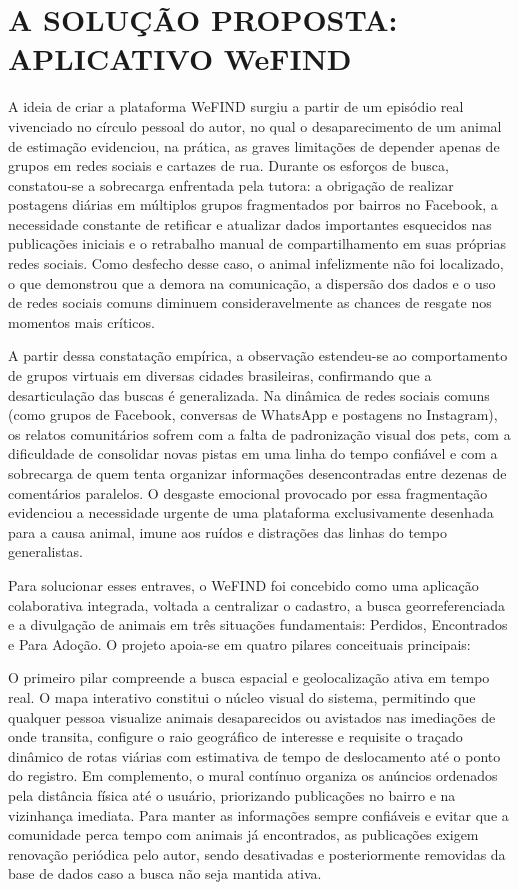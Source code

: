 \section{A SOLUÇÃO PROPOSTA: APLICATIVO WeFIND}

A ideia de criar a plataforma WeFIND surgiu a partir de um episódio real vivenciado no círculo pessoal do autor, no qual o desaparecimento de um animal de estimação evidenciou, na prática, as graves limitações de depender apenas de grupos em redes sociais e cartazes de rua. Durante os esforços de busca, constatou-se a sobrecarga enfrentada pela tutora: a obrigação de realizar postagens diárias em múltiplos grupos fragmentados por bairros no Facebook, a necessidade constante de retificar e atualizar dados importantes esquecidos nas publicações iniciais e o retrabalho manual de compartilhamento em suas próprias redes sociais. Como desfecho desse caso, o animal infelizmente não foi localizado, o que demonstrou que a demora na comunicação, a dispersão dos dados e o uso de redes sociais comuns diminuem consideravelmente as chances de resgate nos momentos mais críticos.

A partir dessa constatação empírica, a observação estendeu-se ao comportamento de grupos virtuais em diversas cidades brasileiras, confirmando que a desarticulação das buscas é generalizada. Na dinâmica de redes sociais comuns (como grupos de Facebook, conversas de WhatsApp e postagens no Instagram), os relatos comunitários sofrem com a falta de padronização visual dos pets, com a dificuldade de consolidar novas pistas em uma linha do tempo confiável e com a sobrecarga de quem tenta organizar informações desencontradas entre dezenas de comentários paralelos. O desgaste emocional provocado por essa fragmentação evidenciou a necessidade urgente de uma plataforma exclusivamente desenhada para a causa animal, imune aos ruídos e distrações das linhas do tempo generalistas.

Para solucionar esses entraves, o WeFIND foi concebido como uma aplicação colaborativa integrada, voltada a centralizar o cadastro, a busca georreferenciada e a divulgação de animais em três situações fundamentais: Perdidos, Encontrados e Para Adoção. O projeto apoia-se em quatro pilares conceituais principais:

O primeiro pilar compreende a busca espacial e geolocalização ativa em tempo real. O mapa interativo constitui o núcleo visual do sistema, permitindo que qualquer pessoa visualize animais desaparecidos ou avistados nas imediações de onde transita, configure o raio geográfico de interesse e requisite o traçado dinâmico de rotas viárias com estimativa de tempo de deslocamento até o ponto do registro. Em complemento, o mural contínuo organiza os anúncios ordenados pela distância física até o usuário, priorizando publicações no bairro e na vizinhança imediata. Para manter as informações sempre confiáveis e evitar que a comunidade perca tempo com animais já encontrados, as publicações exigem renovação periódica pelo autor, sendo desativadas e posteriormente removidas da base de dados caso a busca não seja mantida ativa.

